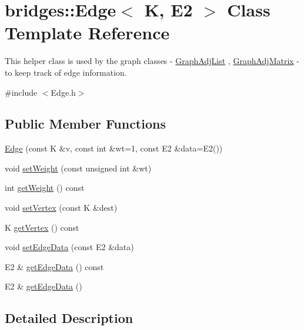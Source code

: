 \hypertarget{classbridges_1_1_edge}{}\section{bridges\+:\+:Edge$<$ K, E2 $>$ Class Template Reference}
\label{classbridges_1_1_edge}


This helper class is used by the graph classes -\/ \mbox{\hyperlink{classbridges_1_1_graph_adj_list}{Graph\+Adj\+List}} , \mbox{\hyperlink{classbridges_1_1_graph_adj_matrix}{Graph\+Adj\+Matrix}} -\/ to keep track of edge information.  




{\ttfamily \#include $<$Edge.\+h$>$}

\subsection*{Public Member Functions}
\begin{DoxyCompactItemize}
\item 
\mbox{\hyperlink{classbridges_1_1_edge_a8a3fc4ec8164fcff2a7fc057d29db8c7}{Edge}} (const K \&v, const int \&wt=1, const E2 \&data=E2())
\item 
void \mbox{\hyperlink{classbridges_1_1_edge_a7f6a9e983490b32d698de7310ffa28c0}{set\+Weight}} (const unsigned int \&wt)
\item 
int \mbox{\hyperlink{classbridges_1_1_edge_a26c103abb7d17e569a764def3c254076}{get\+Weight}} () const
\item 
void \mbox{\hyperlink{classbridges_1_1_edge_a6818ee110efa9db2b16323ee443e9ab2}{set\+Vertex}} (const K \&dest)
\item 
K \mbox{\hyperlink{classbridges_1_1_edge_ab02ff346e56eca417ac8caddbbc870f4}{get\+Vertex}} () const
\item 
void \mbox{\hyperlink{classbridges_1_1_edge_a0f4b37731a5510b46709b095fa6eefb5}{set\+Edge\+Data}} (const E2 \&data)
\item 
E2 \& \mbox{\hyperlink{classbridges_1_1_edge_aeed89848ebfef9a1cc188c32172f1b9c}{get\+Edge\+Data}} () const
\item 
E2 \& \mbox{\hyperlink{classbridges_1_1_edge_a59ce201560b26ec18a1947a38c82e36f}{get\+Edge\+Data}} ()
\end{DoxyCompactItemize}


\subsection{Detailed Description}
